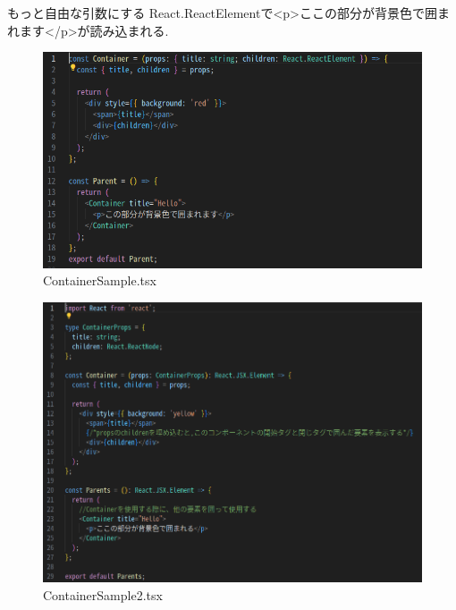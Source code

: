 \documentclass[aspectratio=169]{beamer}
\begin{document}
\begin{frame}[allowframebreaks]{もっと自由な引数にする}
    React.ReactElementで<p>ここの部分が背景色で囲まれます</p>が読み込まれる.
    \begin{figure}
        \centering
       \includegraphics[scale=0.35]{ContainerSample_tsx.png}
       \caption{ContainerSample.tsx}
    \end{figure}
    \begin{figure}
        \centering
       \includegraphics[scale=0.26]{ContainerSample2_tsx.png}
       \caption{ContainerSample2.tsx}
    \end{figure}
\end{frame}
\end{document}
